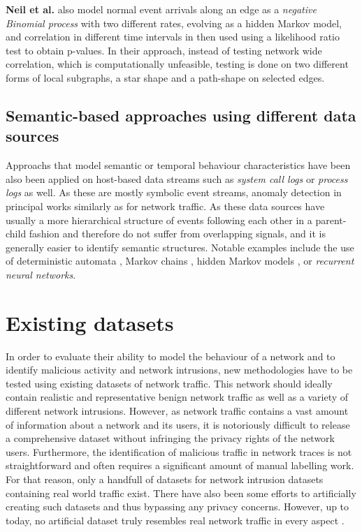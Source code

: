 \textbf{Neil et al.}  \cite{neil2013scan} also model normal event arrivals along an edge as a \textit{negative Binomial process} with two different rates, evolving as a hidden Markov model, and correlation in different time intervals in then used  using a likelihood ratio test to obtain p-values. In their approach, instead of testing network wide correlation, which is computationally unfeasible, testing is done on two different forms of local subgraphs, a star shape and a path-shape on selected edges. 


\subsection{Semantic-based approaches using different data sources}

Approachs that model semantic or temporal behaviour characteristics have been also been applied on host-based data streams such as \textit{system call logs} or \textit{process logs} as well. As these are mostly symbolic event streams, anomaly detection in principal works similarly as for network traffic. As these data sources have usually a more hierarchical structure of events following each other in a parent-child fashion and therefore do not suffer from overlapping signals, and it is generally easier to identify semantic structures. Notable examples include the use of deterministic automata \cite{warrender1999detecting}, Markov chains \cite{ye2000markov}, hidden Markov models \cite{yeung2003host,hu2009simple}, or \textit{recurrent neural networks}\cite{du2017deeplog}.


\section{Existing datasets}

In order to evaluate their ability to model the behaviour of a network and to identify malicious activity and network intrusions, new methodologies have to be tested using existing datasets of network traffic. This network should ideally contain realistic and representative benign network traffic as well as a variety of different network intrusions. However, as  network traffic contains a vast amount of information about a network and its users, it is notoriously difficult to release a comprehensive dataset without infringing the privacy rights of the network users. 
Furthermore, the identification of malicious traffic in network traces is not straightforward and often requires a significant amount of manual labelling work.
For that reason, only a handfull of datasets for network intrusion datasets containing real world traffic exist. There have also been some efforts to artificially creating such datasets and thus bypassing any privacy concerns. However, up to today, no artificial dataset truly resembles real network traffic in every aspect \cite{nisioti2018intrusion}.

